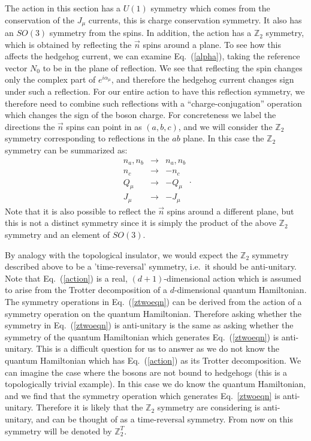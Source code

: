 \documentclass[prb,twocolumn]{revtex4-1}
\def\ztwo{\mathbb{Z}_2}
\def\ztwot{\mathbb{Z}_2^T}
\begin{document}
The action in this section has a $U(1)$ symmetry which comes from the conservation of the $J_\mu$ currents, this is charge conservation symmetry. It also has an $SO(3)$ symmetry from the spins. In addition, the action has 
a $\ztwo$ symmetry, which is obtained by reflecting the $\vec{n}$ spins around a plane. To see how this affects the hedgehog current, we can examine Eq.~(\ref{alpha}), taking the reference vector $N_0$ to be in the plane of reflection. We see that reflecting the spin changes only the complex part of $e^{i\alpha_\mu}$, and therefore the hedgehog current changes sign under such a reflection. For our entire action to have this reflection symmetry, we therefore need to combine such reflections with a ``charge-conjugation'' operation which changes the sign of the boson charge. For concreteness we label the directions the $\vec n$ spins can point in as $(a,b,c)$, and we will consider the $\ztwo$ symmetry corresponding to reflections in the $ab$ plane. In this case the $\ztwo$ symmetry can be summarized as:
\begin{equation}
\begin{array}{ccc}
n_a,n_b & \rightarrow & n_a,n_b \\
n_c & \rightarrow & -n_c\\
Q_\mu & \rightarrow & -Q_\mu\\
J_\mu & \rightarrow & -J_\mu 
\end{array}.
\label{ztwoeqn}
\end{equation}
Note that it is also possible to reflect the $\vec n$ spins around a different plane, but this is not a distinct symmetry since it is simply the product of the above $\ztwo$ symmetry and an element of $SO(3)$. 

By analogy with the topological insulator, we would expect the $\ztwo$ symmetry described above to be a 'time-reversal' symmetry, i.e.~it should be anti-unitary. Note that Eq.~(\ref{action}) is a real, $(d+1)$-dimensional action which is assumed to arise from the Trotter decomposition of a $d$-dimensional quantum Hamiltonian. The symmetry operations in Eq.~(\ref{ztwoeqn}) can be derived from the action of a symmetry operation on the quantum Hamiltonian. Therefore asking whether the symmetry in Eq.~(\ref{ztwoeqn}) is anti-unitary is the same as asking whether the symmetry of the quantum Hamiltonian which generates Eq.~(\ref{ztwoeqn}) is anti-unitary. This is a difficult question for us to answer as we do not know the quantum Hamiltonian which has Eq.~(\ref{action}) as its Trotter decomposition. We can imagine the case where the bosons are not bound to hedgehogs (this is a topologically trivial example). In this case we do know the quantum Hamiltonian, and we find that the symmetry operation which generates Eq.~\ref{ztwoeqn} is anti-unitary. Therefore it is likely that the $\ztwo$ symmetry are considering is anti-unitary, and can be thought of as a time-reversal symmetry. From now on this symmetry will be denoted by $\ztwot$.
\end{document}
